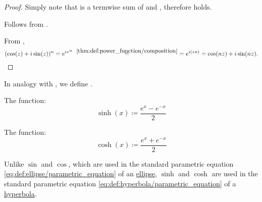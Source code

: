 \begin{proof}
   Simply note that  is a termwise sum of  and , therefore  holds.

   Follows from .

   From ,
  \begin{equation*}
    (\cos(z) + i \sin(z))^n
    =
    {e^{iz}}^n
    \reloset {\ref{thm:def:power_function/composition}} {=}
    =
    e^{i(zn)}
    =
    \cos(nz) + i \sin(nz).
  \end{equation*}
\end{proof}


\begin{definition}\label{def:hyperbolic_trigonometric_functions}
  In analogy with , we define .

  \begin{thmenum}
     The  function:
    \begin{equation*}
      \sinh(x) \coloneqq \frac {e^x - e^{-x}} 2
    \end{equation*}

     The  function:
    \begin{equation*}
      \cosh(x) \coloneqq \frac {e^x + e^{-x}} 2
    \end{equation*}
  \end{thmenum}
\end{definition}
\begin{comments}
  \item Unlike \( \sin \) and \( \cos \), which are used in the standard parametric equation \eqref{eq:def:ellipse/parametric_equation} of an \hyperref[def:ellipse]{ellipse}, \( \sinh \) and \( \cosh \) are used in the standard parametric equation \eqref{eq:def:hyperbola/parametric_equation} of a \hyperref[def:hyperbola]{hyperbola}.
\end{comments}

